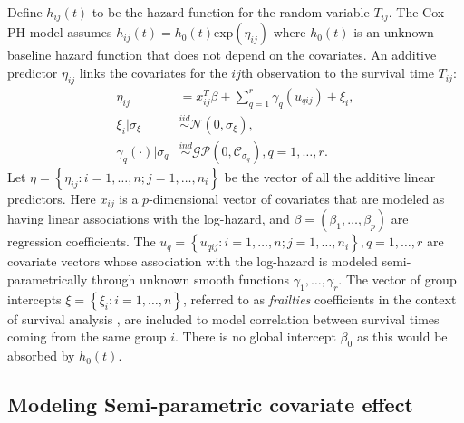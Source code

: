 \documentclass[ba]{imsart}
\begin{document}
Define $h_{ij}(t)$ to be the hazard function for the random variable $T_{ij}$. The Cox PH model assumes $h_{ij}(t) = h_0(t)\text{exp}(\eta_{ij})$ where $h_0(t)$ is an unknown baseline hazard function that does not depend on the covariates. An additive predictor $\eta_{ij}$ links the covariates for the $ij$th observation to the survival time $T_{ij}$:
\begin{equation}\begin{aligned}\label{eqn:eta}
\eta_{ij} &=x_{ij}^{T}\beta+\sum_{q=1}^{r} \gamma_q(u_{qij}) +\xi_{i} , \\
\xi_i | \sigma_{\xi} &\overset{iid}{\sim} \mathcal{N}(0,\sigma_{\xi}) , \\
\gamma_{q}(\cdot)|\sigma_{q} &\overset{ind}{\sim} \mathcal{GP}\left(0,\mathcal{C}_{\sigma_q}\right), q = 1,\ldots,r .
\end{aligned}\end{equation}
Let $\eta = \left\{ \eta_{ij}: i = 1,\ldots,n; j = 1,\ldots,n_{i}\right\}$ be the vector of all the additive linear predictors. Here $x_{ij}$ is a $p$-dimensional vector of covariates that are modeled as having linear associations with the log-hazard, and $\beta = (\beta_{1},\ldots,\beta_{p})$ are regression coefficients. The $u_{q} = \left\{u_{qij}: i = 1,\ldots,n; j = 1,\ldots,n_{i} \right\}, q = 1,\ldots,r$ are covariate vectors whose association with the log-hazard is modeled semi-parametrically through unknown smooth functions $\gamma_1,\ldots,\gamma_r$. The vector of group intercepts $\xi = \left\{ \xi_{i}: i=1,\ldots,n\right\}$, referred to as \textit{frailties} coefficients in the context of survival analysis \citep{frailty}, are included to model correlation between survival times coming from the same group $i$. There is no global intercept $\beta_{0}$ as this would be absorbed by $h_{0}(t)$.

\subsection{Modeling Semi-parametric covariate effect}\label{subsec:smooth}
\end{document}
